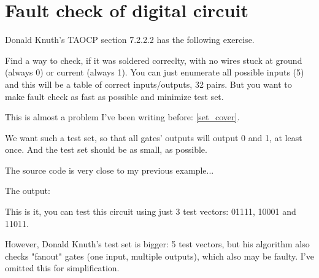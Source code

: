 \section{Fault check of digital circuit}

\renewcommand{\CURPATH}{MaxSxT/fault_check}

Donald Knuth's TAOCP section 7.2.2.2 has the following exercise.

\begin{figure}[H]
\centering
{}
\end{figure}

Find a way to check, if it was soldered correclty, with no wires stuck at ground (always 0) or current (always 1).
You can just enumerate all possible inputs (5) and this will be a table of correct inputs/outputs, 32 pairs.
But you want to make fault check as fast as possible and minimize test set.

This is almost a problem I've been writing before: \ref{set_cover}.

We want such a test set, so that all gates' outputs will output 0 and 1, at least once.
And the test set should be as small, as possible.

The source code is very close to my previous example...



The output:



This is it, you can test this circuit using just 3 test vectors: 01111, 10001 and 11011.

However, Donald Knuth's test set is bigger: 5 test vectors, but his algorithm also checks "fanout" gates (one input, multiple outputs), which also may be faulty.
I've omitted this for simplification.

